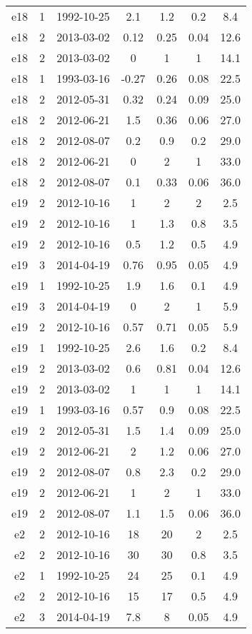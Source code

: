 \begin{table*}[htp]
\begin{tabular}{ccccccc}
e18 & 1 & 1992-10-25 & 2.1 & 1.2 & 0.2 & 8.4 \\
e18 & 2 & 2013-03-02 & 0.12 & 0.25 & 0.04 & 12.6 \\
e18 & 2 & 2013-03-02 & 0 & 1 & 1 & 14.1 \\
e18 & 1 & 1993-03-16 & -0.27 & 0.26 & 0.08 & 22.5 \\
e18 & 2 & 2012-05-31 & 0.32 & 0.24 & 0.09 & 25.0 \\
e18 & 2 & 2012-06-21 & 1.5 & 0.36 & 0.06 & 27.0 \\
e18 & 2 & 2012-08-07 & 0.2 & 0.9 & 0.2 & 29.0 \\
e18 & 2 & 2012-06-21 & 0 & 2 & 1 & 33.0 \\
e18 & 2 & 2012-08-07 & 0.1 & 0.33 & 0.06 & 36.0 \\
e19 & 2 & 2012-10-16 & 1 & 2 & 2 & 2.5 \\
e19 & 2 & 2012-10-16 & 1 & 1.3 & 0.8 & 3.5 \\
e19 & 2 & 2012-10-16 & 0.5 & 1.2 & 0.5 & 4.9 \\
e19 & 3 & 2014-04-19 & 0.76 & 0.95 & 0.05 & 4.9 \\
e19 & 1 & 1992-10-25 & 1.9 & 1.6 & 0.1 & 4.9 \\
e19 & 3 & 2014-04-19 & 0 & 2 & 1 & 5.9 \\
e19 & 2 & 2012-10-16 & 0.57 & 0.71 & 0.05 & 5.9 \\
e19 & 1 & 1992-10-25 & 2.6 & 1.6 & 0.2 & 8.4 \\
e19 & 2 & 2013-03-02 & 0.6 & 0.81 & 0.04 & 12.6 \\
e19 & 2 & 2013-03-02 & 1 & 1 & 1 & 14.1 \\
e19 & 1 & 1993-03-16 & 0.57 & 0.9 & 0.08 & 22.5 \\
e19 & 2 & 2012-05-31 & 1.5 & 1.4 & 0.09 & 25.0 \\
e19 & 2 & 2012-06-21 & 2 & 1.2 & 0.06 & 27.0 \\
e19 & 2 & 2012-08-07 & 0.8 & 2.3 & 0.2 & 29.0 \\
e19 & 2 & 2012-06-21 & 1 & 2 & 1 & 33.0 \\
e19 & 2 & 2012-08-07 & 1.1 & 1.5 & 0.06 & 36.0 \\
e2 & 2 & 2012-10-16 & 18 & 20 & 2 & 2.5 \\
e2 & 2 & 2012-10-16 & 30 & 30 & 0.8 & 3.5 \\
e2 & 1 & 1992-10-25 & 24 & 25 & 0.1 & 4.9 \\
e2 & 2 & 2012-10-16 & 15 & 17 & 0.5 & 4.9 \\
e2 & 3 & 2014-04-19 & 7.8 & 8 & 0.05 & 4.9 \\

\end{tabular}
\end{table*}
